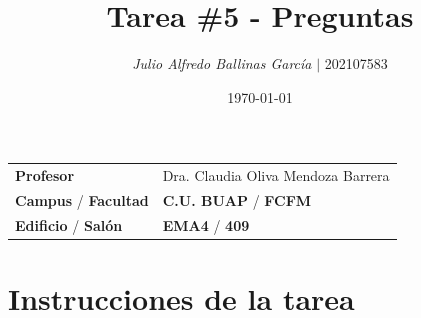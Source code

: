\documentclass{article}
\title{\textcolor{Apple Green}{\textbf{Tarea}} \textcolor{Sun}{\textbf{\#}}\textcolor{Cinnabar}{\textbf{5}} - Preguntas }
\author{\emph{Julio Alfredo Ballinas García} $\boldsymbol{\mid}$ 202107583}
\date{\today}
\begin{document}
\maketitle



\begin{mybox}
\noindent\begin{tabular}{@{}ll}
	{\bfseries{Profesor}} & Dra. Claudia Oliva Mendoza Barrera\\
	\textcolor{prussianblue}{\bfseries{Campus}} / \textcolor{trueblue}{\bfseries{Facultad}}  & \textcolor{prussianblue}{\bfseries{C.U. BUAP}} /  \textcolor{trueblue}{\bfseries{FCFM}} \\
	\textcolor{prussianblue}{\bfseries{Edificio}} /  \textcolor{trueblue}{\bfseries{Salón}}    & 	\textcolor{prussianblue}{\bfseries{EMA4}} /  \textcolor{trueblue}{\bfseries{409}}   
\end{tabular} 
\end{mybox} \vspace{1cm}

\section{Instrucciones de la tarea}
\end{document}
